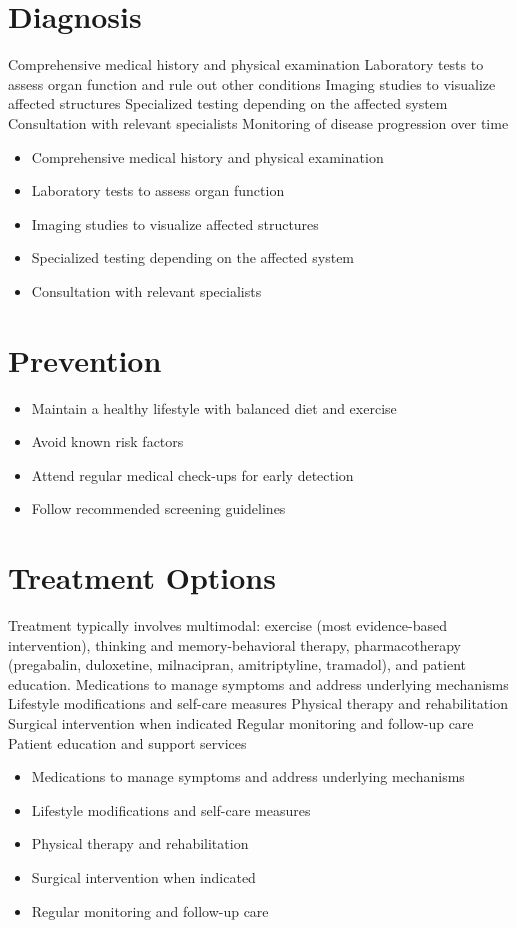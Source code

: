 \section{Diagnosis}
Comprehensive medical history and physical examination Laboratory tests to assess organ function and rule out other conditions Imaging studies to visualize affected structures Specialized testing depending on the affected system Consultation with relevant specialists Monitoring of disease progression over time

\begin{itemize}[noitemsep]
  \item Comprehensive medical history and physical examination
  \item Laboratory tests to assess organ function
  \item Imaging studies to visualize affected structures
  \item Specialized testing depending on the affected system
  \item Consultation with relevant specialists
\end{itemize}
\section{Prevention}
\begin{itemize}[noitemsep]
  \item Maintain a healthy lifestyle with balanced diet and exercise
  \item Avoid known risk factors
  \item Attend regular medical check-ups for early detection
  \item Follow recommended screening guidelines
\end{itemize}
\section{Treatment Options}
Treatment typically involves multimodal: exercise (most evidence-based intervention), thinking and memory-behavioral therapy, pharmacotherapy (pregabalin, duloxetine, milnacipran, amitriptyline, tramadol), and patient education. Medications to manage symptoms and address underlying mechanisms Lifestyle modifications and self-care measures Physical therapy and rehabilitation Surgical intervention when indicated Regular monitoring and follow-up care Patient education and support services

\begin{itemize}[noitemsep]
  \item Medications to manage symptoms and address underlying mechanisms
  \item Lifestyle modifications and self-care measures
  \item Physical therapy and rehabilitation
  \item Surgical intervention when indicated
  \item Regular monitoring and follow-up care
\end{itemize}
